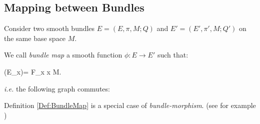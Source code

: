 \documentclass[Main]{subfiles}
\begin{document}
			
			
		\subsection{Mapping between Bundles}
			Consider two smooth bundles $E=(E,\pi,M; Q)$ and $E'=(E',\pi',M; Q')$ on the same base space $M$.
			\begin{definition}\label{Def:BundleMap}
				We call \emph{bundle map} a smooth function $\phi: E \rightarrow E'$ such that:			
			 	\begin{compactdisplaymath}
			 		\phi(E_{x})= F_{x} \qquad \forall x \in M.
			 	\end{compactdisplaymath}
				\textit{i.e.} the following graph commutes:

				\vspace{-2mm}			
				\centering
			\end{definition}
				Definition \ref{Def:BundleMap} is a special case of \emph{bundle-morphism}. (see for example \cite{G.Sardanashvily2013})
\end{document}
